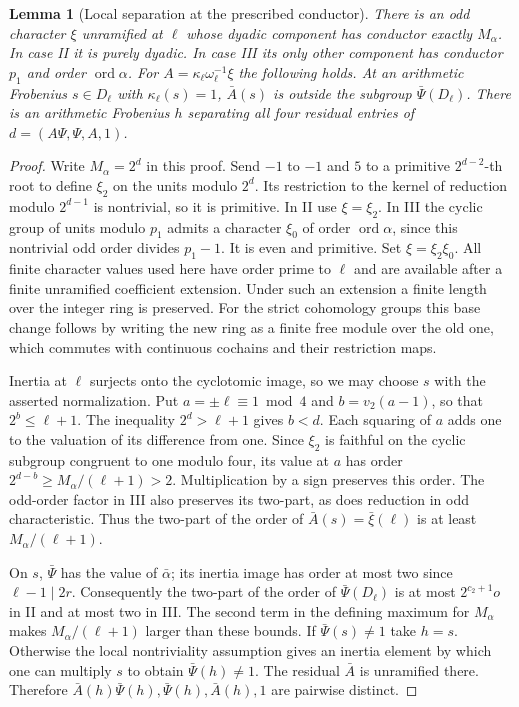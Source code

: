 \documentclass[a4paper,11pt]{article}
\newtheorem{lemma}[proposition]{Lemma}
\theoremstyle{definition}
\theoremstyle{remark}
\numberwithin{equation}{section}
\begin{document}
\begin{lemma}[Local separation at the prescribed conductor]
\leavevmode\label{lem:prescribedaux563}
There is an odd character \(\xi\) unramified at \(\ell\)
whose dyadic component has conductor exactly \(M_\alpha\).
In case II it is purely dyadic. In case III its only other
component has conductor \(p_1\) and order \(\operatorname{ord}\alpha\).
For \(A=\kappa_\ell\omega_\ell^{-1}\xi\) the following holds.
At an arithmetic Frobenius \(s\in D_\ell\) with \(\kappa_\ell(s)=1\),
\(\bar A(s)\) is outside the subgroup \(\bar\Psi(D_\ell)\).
There is an arithmetic Frobenius \(h\) separating all four
residual entries of \(d=(A\Psi,\Psi,A,1)\).
\end{lemma}
\begin{proof}
Write \(M_\alpha=2^d\) in this proof. Send \(-1\) to \(-1\)
and \(5\) to a primitive \(2^{d-2}\)-th root to define
\(\xi_2\) on the units modulo \(2^d\). Its restriction to the
kernel of reduction modulo \(2^{d-1}\) is nontrivial, so it
is primitive. In II use \(\xi=\xi_2\). In III the cyclic
group of units modulo \(p_1\) admits a character \(\xi_0\)
of order \(\operatorname{ord}\alpha\), since this nontrivial
odd order divides \(p_1-1\). It is even and primitive.
Set \(\xi=\xi_2\xi_0\). All finite character values used here
have order prime to \(\ell\) and are available after a finite
unramified coefficient extension. Under such an extension a
finite length over the integer ring is preserved. For the
strict cohomology groups this base change follows by writing
the new ring as a finite free module over the old one, which
commutes with continuous cochains and their restriction maps.

Inertia at \(\ell\) surjects onto the cyclotomic image, so we
may choose \(s\) with the asserted normalization. Put
\(a=\pm\ell\equiv1\bmod4\) and \(b=v_2(a-1)\), so that
\(2^b\le\ell+1\). The inequality \(2^d>\ell+1\) gives
\(b<d\). Each squaring of \(a\) adds one to the valuation of
its difference from one. Since \(\xi_2\) is faithful on the
cyclic subgroup congruent to one modulo four, its value at
\(a\) has order \(2^{d-b}\ge M_\alpha/(\ell+1)>2\).
Multiplication by a sign preserves this order. The odd-order
factor in III also preserves its two-part, as does reduction
in odd characteristic. Thus the two-part of the order of
\(\bar A(s)=\bar\xi(\ell)\) is at least \(M_\alpha/(\ell+1)\).

On \(s\), \(\bar\Psi\) has the value of \(\bar\alpha\); its
inertia image has order at most two since \(\ell-1\mid 2r\).
Consequently the two-part of the order of \(\bar\Psi(D_\ell)\)
is at most \(2^{c_2+1}o\) in II and at most two in III.
The second term in the defining maximum for \(M_\alpha\)
makes \(M_\alpha/(\ell+1)\) larger than these bounds.
If \(\bar\Psi(s)\ne1\) take \(h=s\). Otherwise the local
nontriviality assumption gives an inertia element by which
one can multiply \(s\) to obtain \(\bar\Psi(h)\ne1\).
The residual \(\bar A\) is unramified there. Therefore
\(\bar A(h)\bar\Psi(h),\bar\Psi(h),\bar A(h),1\)
are pairwise distinct.
\end{proof}
\end{document}
